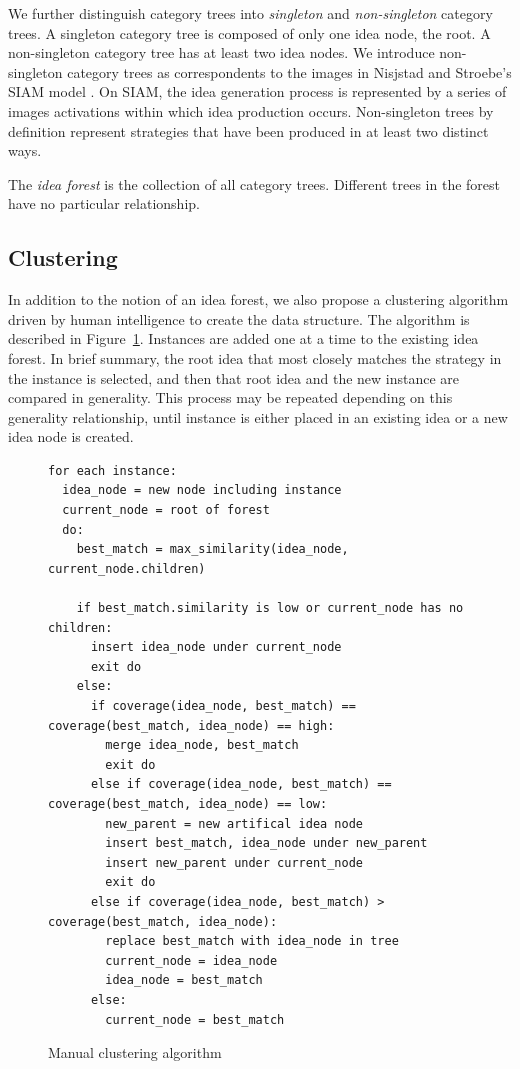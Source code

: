 We further distinguish category trees into \emph{singleton} and \emph{non-singleton} category trees. A singleton category tree is composed of only one idea node, the root. A non-singleton category tree has at least two idea nodes. We introduce non-singleton category trees as correspondents to the images in Nisjstad and Stroebe's SIAM model \cite{nijstad_how_2006}. On SIAM, the idea generation process is represented by a series of images activations within which idea production occurs. Non-singleton trees by definition represent strategies that have been produced in at least two distinct ways.

The \emph{idea forest} is the collection of all category trees. Different trees in the forest have no particular relationship.

\subsection{Clustering}

In addition to the notion of an idea forest, we also propose a clustering algorithm driven by human intelligence to create the data structure. The algorithm is described in Figure~\ref{fig:cluseringalg}. Instances are added one at a time to the existing idea forest. In brief summary, the root idea that most closely matches the strategy in the instance is selected, and then that root idea and the new instance are compared in generality. This process may be repeated depending on this generality relationship, until instance is either placed in an existing idea or a new idea node is created.

\begin{figure}[ht]
\small
\begin{verbatim}
for each instance:
  idea_node = new node including instance
  current_node = root of forest
  do:
    best_match = max_similarity(idea_node, current_node.children)

    if best_match.similarity is low or current_node has no children:
      insert idea_node under current_node
      exit do
    else:
      if coverage(idea_node, best_match) == coverage(best_match, idea_node) == high:
        merge idea_node, best_match
        exit do
      else if coverage(idea_node, best_match) == coverage(best_match, idea_node) == low:
        new_parent = new artifical idea node
        insert best_match, idea_node under new_parent
        insert new_parent under current_node
        exit do
      else if coverage(idea_node, best_match) > coverage(best_match, idea_node):
        replace best_match with idea_node in tree
        current_node = idea_node
        idea_node = best_match
      else:
        current_node = best_match
\end{verbatim}
\caption{Manual clustering algorithm}
\label{fig:cluseringalg}
\end{figure}

